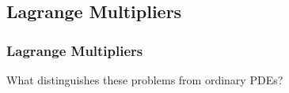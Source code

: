 \documentclass[aspectratio=169,xcolor=dvipsnames,11pt]{beamer}
\begin{document}
\subsection{Lagrange Multipliers}\label{sec:complementarity}
\begin{frame}\frametitle{Lagrange Multipliers}
 
 \begin{center}
 \Large What distinguishes these problems from ordinary PDEs?
 \end{center}
 
% 
%
\end{frame}
\end{document}
